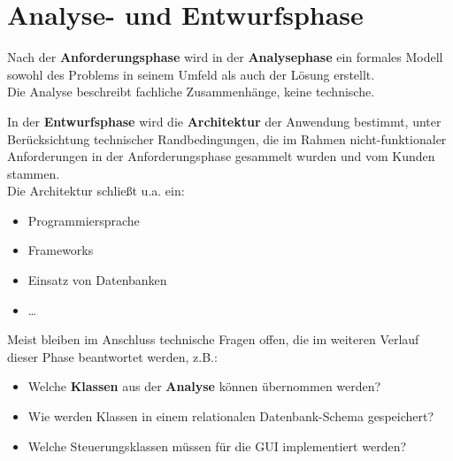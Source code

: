 \section{Analyse- und Entwurfsphase}

\begin{tcolorbox}[title=Analysephase]
    Nach der \textbf{Anforderungsphase} wird in der \textbf{Analysephase} ein formales Modell sowohl des Problems in seinem Umfeld als auch der Lösung erstellt.\\
    Die Analyse beschreibt fachliche Zusammenhänge, keine technische.
\end{tcolorbox}

\begin{tcolorbox}[title=Entwurfsphase]

In der \textbf{Entwurfsphase} wird die \textbf{Architektur} der Anwendung bestimmt, unter Berücksichtung technischer Randbedingungen, die im Rahmen nicht-funktionaler Anforderungen in der Anforderungsphase gesammelt wurden und vom Kunden stammen.\\
Die Architektur schließt u.a. ein:

\begin{itemize}
    \item Programmiersprache
    \item Frameworks
    \item Einsatz von Datenbanken
    \item \ldots
\end{itemize}

\noindent
Meist bleiben im Anschluss technische Fragen offen, die im weiteren Verlauf dieser Phase beantwortet werden, z.B.:

\begin{itemize}
    \item Welche \textbf{Klassen} aus der \textbf{Analyse} können übernommen werden?
    \item Wie werden Klassen in einem relationalen Datenbank-Schema gespeichert?
    \item Welche Steuerungsklassen müssen für die GUI implementiert werden?
\end{itemize}
\end{tcolorbox}
